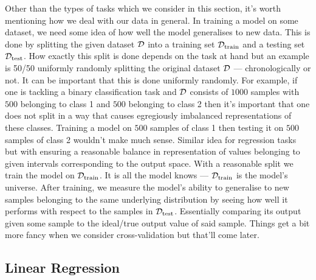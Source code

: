 \documentclass[11pt]{article}
\begin{document}
Other than the types of tasks which we consider in this section, it's worth mentioning how we deal with our data in general. In training a model on some dataset, we need some idea of how well the model generalises to new data. This is done by splitting the given dataset $\mathcal{D}$ into a training set $\mathcal{D}_{\text{train}}$ and a testing set $\mathcal{D}_{\text{test}}$. How exactly this split is done depends on the task at hand but an example is 50/50 uniformly randomly splitting the original dataset $\mathcal{D}$ — chronologically or not. It can be important that this is done uniformly randomly. For example, if one is tackling a binary classification task and $\mathcal{D}$ consists of $1000$ samples with $500$ belonging to class 1 and $500$ belonging to class 2 then it's important that one does not split in a way that causes egregiously imbalanced representations of these classes. Training a model on $500$ samples of class 1 then testing it on $500$ samples of class 2 wouldn't make much sense. Similar idea for regression tasks but with ensuring a reasonable balance in representation of values belonging to given intervals corresponding to the output space. With a reasonable split we train the model on $\mathcal{D}_{\text{train}}$. It is all the model knows — $\mathcal{D}_{\text{train}}$ is the model's universe. After training, we measure the model's ability to generalise to new samples belonging to the same underlying distribution by seeing how well it performs with respect to the samples in $\mathcal{D}_{\text{test}}$. Essentially comparing its output given some sample to the ideal/true output value of said sample. Things get a bit more fancy when we consider cross-validation but that'll come later.

\subsection{Linear Regression}
\end{document}
